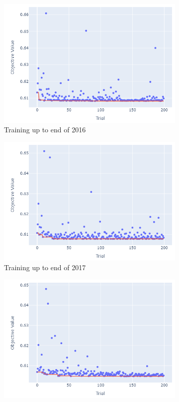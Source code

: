 \documentclass[12pt,twoside]{report}
\begin{document}
\begin{figure}[htb]
\centering
\captionsetup{justification=centering}
\begin{subfigure}{.33\linewidth}
  \centering
  \includegraphics[width=0.95\linewidth]{figures/lr_cutoff_2016.png}
  \caption{Training up to end of 2016}
\end{subfigure}%
\begin{subfigure}{.33\linewidth}
  \centering
  \includegraphics[width=0.95\linewidth]{figures/lr_cutoff_2017.png}
  \caption{Training up to end of 2017}
\end{subfigure}%
\begin{subfigure}{.33\linewidth}
  \centering
  \includegraphics[width=0.95\linewidth]{figures/lr_cutoff_2018.png}

\end{subfigure}
\end{figure}
\end{document}
